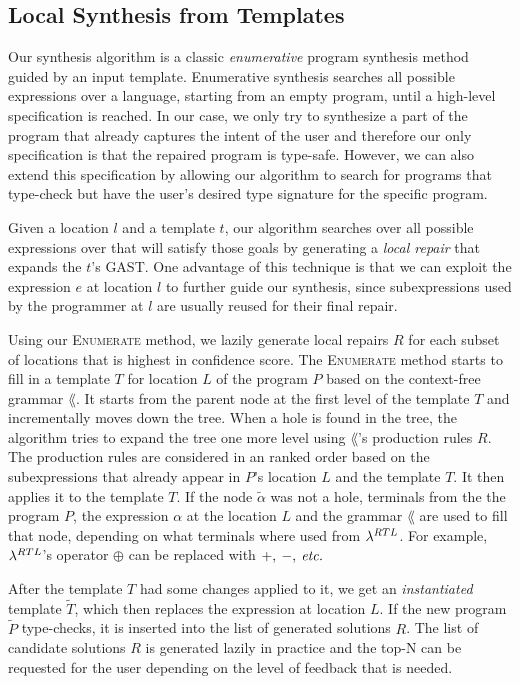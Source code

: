 \subsection{Local Synthesis from Templates}
\label{subsec:local-synthesis}

Our synthesis algorithm is a classic \emph{enumerative} program synthesis method
guided by an input template. Enumerative synthesis searches all possible
expressions over a language, starting from an empty program, until a high-level
specification is reached. In our case, we only try to synthesize a part of the
program that already captures the intent of the user and therefore our only
specification is that the repaired program is type-safe. However, we can also
extend this specification by allowing our algorithm to search for programs that
type-check but have the user's desired type signature for the specific program.

Given a location $l$ and a template $t$, our algorithm searches over all
possible expressions over \lang that will satisfy those goals by generating a
\emph{local repair} that expands the $t$'s GAST. One advantage of this technique
is that we can exploit the expression $e$ at location $l$ to further guide our
synthesis, since subexpressions used by the programmer at $l$ are usually reused
for their final repair.



Using our \textsc{Enumerate} method, we lazily generate local repairs $R$ for
each subset of locations that is highest in confidence score. The
\textsc{Enumerate} method starts to fill in a template $T$ for location $L$ of
the program $P$ based on the context-free grammar $\lang$. It starts from the
parent node at the first level of the template $T$ and incrementally moves
down the tree. When a hole is found in the tree, the algorithm tries to expand
the tree one more level using $\lang$'s production rules $R$. The production
rules are considered in an ranked order based on the subexpressions that already
appear in $P$'s location $L$ and the template $T$. It then applies it to the
template $T$. If the node $\tilde{\alpha}$ was not a hole, terminals from the
the program $P$, the expression $\alpha$ at the location $L$ and the grammar
$\lang$ are used to fill that node, depending on what terminals where used from
$\lambda^{RTL}$. For example, $\lambda^{RTL}$'s operator $\oplus$ can be replaced
with $+,\:-,\:\textit{etc.}$

After the template $T$ had some changes applied to it, we get an
\emph{instantiated} template $\tilde{T}$, which then replaces the expression at
location $L$. If the new program $\tilde{P}$ type-checks, it is inserted into
the list of generated solutions $R$. The list of candidate solutions $R$ is
generated lazily in practice and the top-N can be requested for the user
depending on the level of feedback that is needed.



